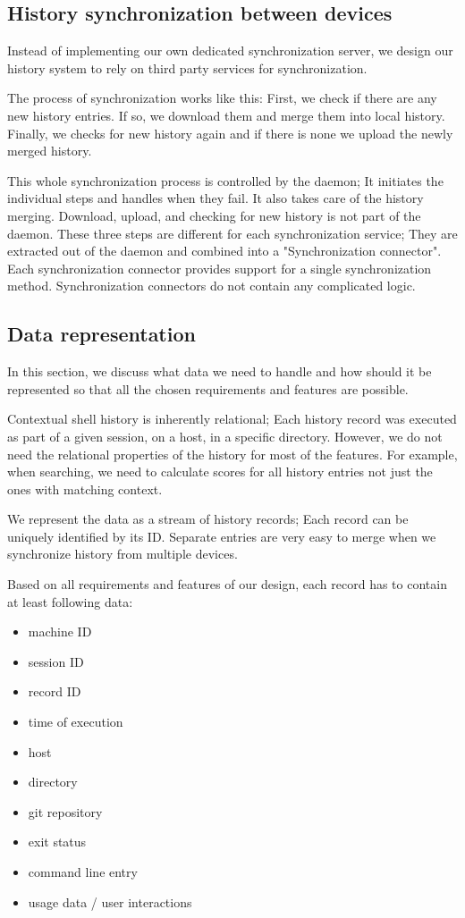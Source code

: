 \documentclass[thesis=M,english]{FITthesis}[2012/10/20]
\begin{document}
\subsection{History synchronization between devices}

Instead of implementing our own dedicated synchronization server, we design our history system to rely on third party services for synchronization. 

The process of synchronization works like this: First, we check if there are any new history entries. If so, we download them and merge them into local history. Finally, we checks for new history again and if there is none we upload the newly merged history. 

This whole synchronization process is controlled by the daemon; It initiates the individual steps and handles when they fail. It also takes care of the history merging.  Download, upload, and checking for new history is not part of the daemon. These three steps are different for each synchronization service; They are extracted out of the daemon and combined into a "Synchronization connector". Each synchronization connector provides support for a single synchronization method. Synchronization connectors do not contain any complicated logic. 


\subsection{Data representation}

In this section, we discuss what data we need to handle and how should it be represented so that all the chosen requirements and features are possible.


Contextual shell history is inherently relational; Each history record was executed as part of a given session, on a host, in a specific directory. However, we do not need the relational properties of the history for most of the features. For example, when searching, we need to calculate scores for all history entries not just the ones with matching context. 

We represent the data as a stream of history records; Each record can be uniquely identified by its ID. Separate entries are very easy to merge when we synchronize history from multiple devices.

Based on all requirements and features of our design, each record has to contain at least following data:
\begin{itemize}
    \item machine ID
    \item session ID
    \item record ID
    \item time of execution
    \item host
    \item directory
    \item git repository
    \item exit status
    \item command line entry
    \item usage data / user interactions
\end{itemize}
\end{document}
